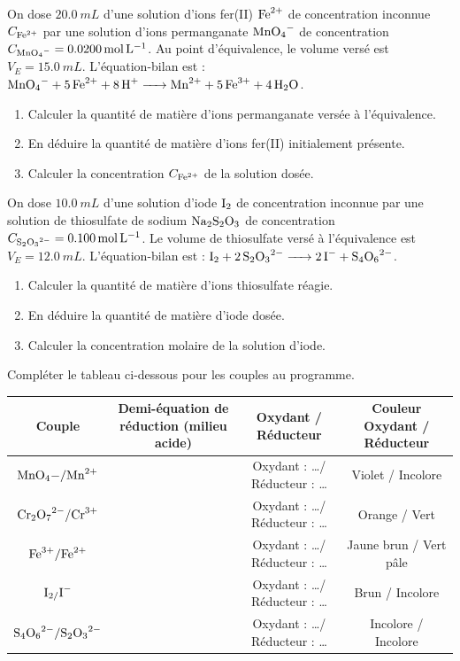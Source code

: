\documentclass[11pt]{article}
\begin{document}
\begin{exercice}
On dose $\SI{20.0}{mL}$ d'une solution d'ions fer(II) $\ce{Fe^{2+}}$ de concentration inconnue $C_{\ce{Fe^{2+}}}$ par une solution d'ions permanganate $\ce{MnO4-}$ de concentration $C_{\ce{MnO4-}} = \SI{0.0200}{mol.L^{-1}}$.
Au point d'équivalence, le volume versé est $V_E = \SI{15.0}{mL}$.
L'équation-bilan est : $\ce{MnO4- + 5 Fe^{2+} + 8 H+ -> Mn^{2+} + 5 Fe^{3+} + 4 H2O}$.
\begin{enumerate}
    \item Calculer la quantité de matière d'ions permanganate versée à l'équivalence.
    \item En déduire la quantité de matière d'ions fer(II) initialement présente.
    \item Calculer la concentration $C_{\ce{Fe^{2+}}}$ de la solution dosée.
\end{enumerate}
\end{exercice}

\begin{exercice}
On dose $\SI{10.0}{mL}$ d'une solution d'iode $\ce{I2}$ de concentration inconnue par une solution de thiosulfate de sodium $\ce{Na2S2O3}$ de concentration $C_{\ce{S2O3^{2-}}} = \SI{0.100}{mol.L^{-1}}$.
Le volume de thiosulfate versé à l'équivalence est $V_E = \SI{12.0}{mL}$.
L'équation-bilan est : $\ce{I2 + 2 S2O3^{2-} -> 2 I- + S4O6^{2-}}$.
\begin{enumerate}
    \item Calculer la quantité de matière d'ions thiosulfate réagie.
    \item En déduire la quantité de matière d'iode dosée.
    \item Calculer la concentration molaire de la solution d'iode.
\end{enumerate}
\end{exercice}

\begin{exercice}
Compléter le tableau ci-dessous pour les couples au programme.

\begin{tabular}{|c|c|c|c|}
\hline
\textbf{Couple} & \textbf{Demi-équation de réduction (milieu acide)} & \textbf{Oxydant / Réducteur} & \textbf{Couleur Oxydant / Réducteur} \\
\hline
$\ce{MnO4-/Mn^{2+}}$ &  & Oxydant : \dots / Réducteur : \dots & Violet / Incolore \\
\hline
$\ce{Cr2O7^{2-}/Cr^{3+}}$ &  & Oxydant : \dots / Réducteur : \dots & Orange / Vert \\
\hline
$\ce{Fe^{3+}/Fe^{2+}}$ &  & Oxydant : \dots / Réducteur : \dots & Jaune brun / Vert pâle \\
\hline
$\ce{I2/I-}$ &  & Oxydant : \dots / Réducteur : \dots & Brun / Incolore \\
\hline
$\ce{S4O6^{2-}/S2O3^{2-}}$ &  & Oxydant : \dots / Réducteur : \dots & Incolore / Incolore \\
\hline
\end{tabular}
\end{exercice}
\end{document}
